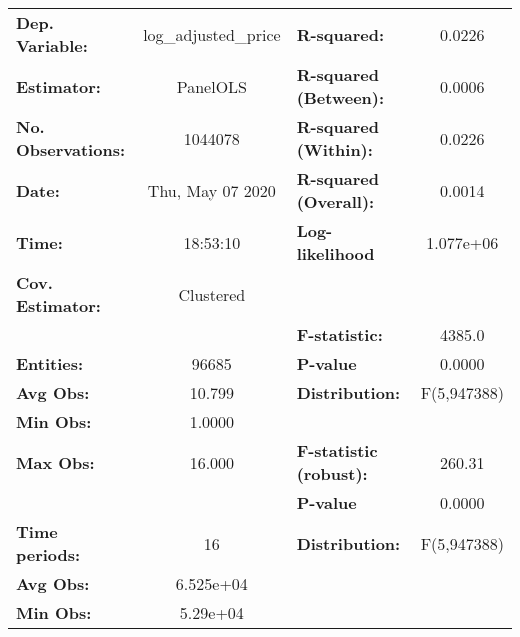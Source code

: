 \documentclass{report}
\begin{document}
\begin{center}
\begin{tabular}{lclc}
\toprule
\textbf{Dep. Variable:}                          & log\_adjusted\_price & \textbf{  R-squared:         }   &      0.0226      \\
\textbf{Estimator:}                              &       PanelOLS       & \textbf{  R-squared (Between):}  &      0.0006      \\
\textbf{No. Observations:}                       &       1044078        & \textbf{  R-squared (Within):}   &      0.0226      \\
\textbf{Date:}                                   &   Thu, May 07 2020   & \textbf{  R-squared (Overall):}  &      0.0014      \\
\textbf{Time:}                                   &       18:53:10       & \textbf{  Log-likelihood     }   &    1.077e+06     \\
\textbf{Cov. Estimator:}                         &      Clustered       & \textbf{                     }   &                  \\
\textbf{}                                        &                      & \textbf{  F-statistic:       }   &      4385.0      \\
\textbf{Entities:}                               &        96685         & \textbf{  P-value            }   &      0.0000      \\
\textbf{Avg Obs:}                                &        10.799        & \textbf{  Distribution:      }   &   F(5,947388)    \\
\textbf{Min Obs:}                                &        1.0000        & \textbf{                     }   &                  \\
\textbf{Max Obs:}                                &        16.000        & \textbf{  F-statistic (robust):} &      260.31      \\
\textbf{}                                        &                      & \textbf{  P-value            }   &      0.0000      \\
\textbf{Time periods:}                           &          16          & \textbf{  Distribution:      }   &   F(5,947388)    \\
\textbf{Avg Obs:}                                &      6.525e+04       & \textbf{                     }   &                  \\
\textbf{Min Obs:}                                &       5.29e+04       & \textbf{                     }   &                  \\

\end{tabular}
\end{center}
\end{document}
